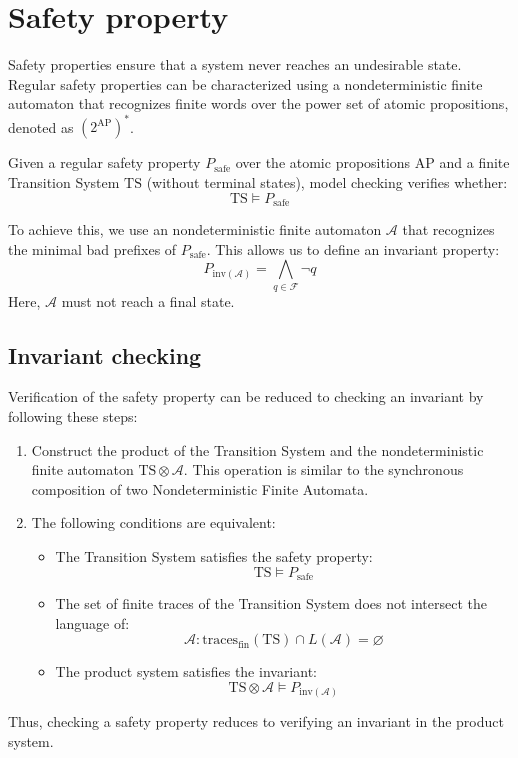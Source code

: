 \section{Safety property}

Safety properties ensure that a system never reaches an undesirable state. 
Regular safety properties can be characterized using a nondeterministic finite automaton that recognizes finite words over the power set of atomic propositions, denoted as $\left(2^{\text{AP}}\right)^\ast$.

\begin{definition}
    Given a regular safety property $P_{\text{safe}}$ over the atomic propositions $\text{AP}$ and a finite Transition System $\text{TS}$ (without terminal states), model checking verifies whether:
    \[\text{TS}\models P_{\text{safe}}\]
\end{definition}
\noindent 
To achieve this, we use an nondeterministic finite automaton $\mathcal{A}$ that recognizes the minimal bad prefixes of $P_{\text{safe}}$.
This allows us to define an invariant property:
\[P_{\text{inv}(\mathcal{A})}=\bigwedge_{q\in\mathcal{F}}\lnot q\]
Here, $\mathcal{A}$ must not reach a final state.

\subsection{Invariant checking}
Verification of the safety property can be reduced to checking an invariant by following these steps:
\begin{enumerate}
    \item Construct the product of the Transition System and the nondeterministic finite automaton $\text{TS}\otimes \mathcal{A}$. 
        This operation is similar to the synchronous composition of two Nondeterministic Finite Automata.
    \item The following conditions are equivalent:
        \begin{itemize}
            \item The Transition System satisfies the safety property: 
                \[\text{TS} \models P_{\text{safe}}\]
            \item The set of finite traces of the Transition System does not intersect the language of:
                \[\mathcal{A}: \text{traces}_{\text{fin}}(\text{TS}) \cap L(\mathcal{A}) = \varnothing\]
            \item The product system satisfies the invariant:
                \[\text{TS}\otimes \mathcal{A} \models P_{\text{inv}(\mathcal{A})}\]
        \end{itemize}
\end{enumerate}
\noindent Thus, checking a safety property reduces to verifying an invariant in the product system.

